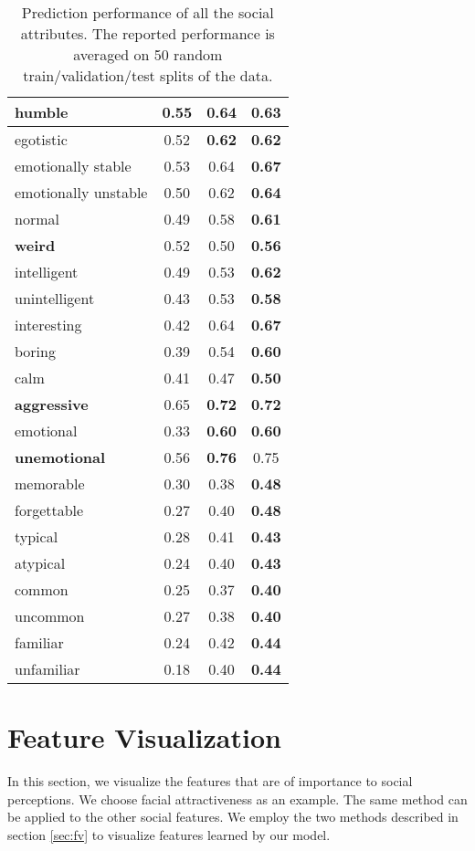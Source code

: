 \documentclass[10pt,twocolumn,letterpaper]{article}
\begin{document}
\begin{center}
\begin{table}[hbt]
{\begin{tabular}{|l||c|c|c|}
humble&0.55 & \textbf{0.64} & 0.63\\
\hline
egotistic&0.52 & \textbf{0.62} & \textbf{0.62}\\
\hline
emotionally stable&0.53 &0.64 & \textbf{0.67}\\
\hline
emotionally unstable&0.50 &0.62 & \textbf{0.64}\\
\hline
normal &0.49 & 0.58 & \textbf{0.61}\\
\hline
{\bf weird} & 0.52& 0.50 & \textbf{0.56} \\
\hline
intelligent&0.49 & 0.53& \textbf{0.62}\\
\hline
unintelligent&0.43 & 0.53 & \textbf{0.58}\\
\hline
interesting&0.42 & 0.64 & \textbf{0.67}\\
\hline
boring&0.39 & 0.54 & \textbf{0.60}\\
\hline
calm&0.41 & 0.47 & \textbf{0.50}\\ 
\hline
{\bf aggressive}&0.65 &\textbf{0.72} & \textbf{0.72}\\ 
\hline
emotional&0.33 &\textbf{0.60}& \textbf{0.60}\\
\hline
{\bf unemotional}&0.56 &\textbf{ 0.76} & 0.75\\
\hline
memorable&0.30 & 0.38 & \textbf{0.48}\\
\hline
forgettable&0.27 &0.40 &\textbf{ 0.48}\\
\hline
typical&0.28 & 0.41 & \textbf{0.43}\\
\hline
atypical&0.24 & 0.40 & \textbf{0.43}\\
\hline
common &0.25 & 0.37 & \textbf{0.40}\\
\hline
uncommon &0.27 & 0.38 & \textbf{0.40}\\
\hline
familiar&0.24 & 0.42 & \textbf{0.44}\\
\hline
unfamiliar&0.18 & 0.40 & \textbf{0.44}\\
\hline
\end{tabular}}
\caption{Prediction performance of all the social attributes. The reported performance is averaged on 50 random train/validation/test splits of the data.}
\label{tb:correlations}
\end{table}
\end{center}

\section{Feature Visualization} \label{viz}
In this section, we visualize the features that are of importance to social perceptions. We choose facial attractiveness as an example. The same method can be applied to the other social features. We employ the two methods described in section \ref{sec:fv} to visualize features learned by our model. 
\end{document}
